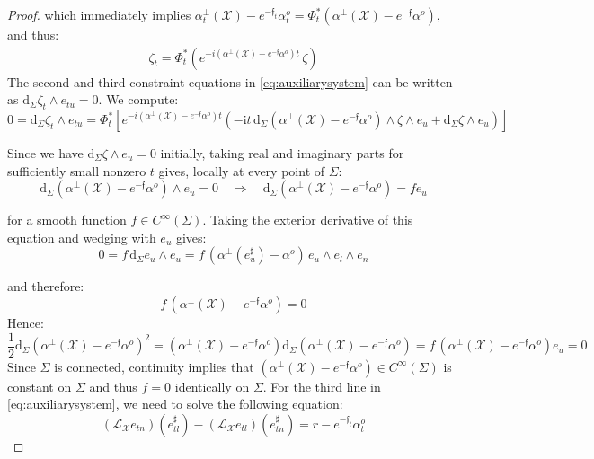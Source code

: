 \documentclass[10pt,reqno,a4paper]{amsart}
\theoremstyle{plain}
\theoremstyle{definition}
\theoremstyle{remark}
\theoremstyle{remark}
\def\dd{\mathrm{d}}
\def\cL{\mathcal{L}}
\def\cX{\mathcal{X}}
\def\cL{\mathcal{L}}
\renewcommand{\(}{ (}
\renewcommand{\)}{ )}
\newcommand{\frf}{\mathfrak{f}}
\begin{document}
\begin{proof}
\noindent
which immediately implies $\alpha^{\perp}_t (\cX) - e^{-\frf_t} \alpha^o_t = \Phi^{\ast}_t (\alpha^{\perp} (\cX) - e^{-\frf} \alpha^o)$, and thus:
\begin{eqnarray}
\label{eq:zetaux}
\zeta_t = \Phi_t^{\ast} (e^{- i (\alpha^{\perp} (\cX) - e^{-\frf} \alpha^o) t}\, \zeta)    
\end{eqnarray}
The second and third constraint equations in \eqref{eq:auxiliarysystem} can be written as $\dd_{\Sigma}\zeta_t \wedge e_{tu} = 0$. We compute:
\begin{equation*}
0 = \dd_{\Sigma}\zeta_t \wedge e_{tu} = \Phi_t^{\ast} [e^{- i (\alpha^{\perp} (\cX) - e^{-\frf} \alpha^o) t} (- \mathrm{i} t\, \dd_{\Sigma} (\alpha^{\perp} (\cX) - e^{-\frf} \alpha^o) \wedge \zeta \wedge e_u + \dd_{\Sigma}\zeta \wedge e_u) ]
\end{equation*}

\noindent
Since we have $\dd_{\Sigma}\zeta \wedge e_u = 0$ initially, taking real and imaginary parts for sufficiently small nonzero $t$ gives, locally at every point of $\Sigma$:
\begin{equation*}
\dd_{\Sigma} (\alpha^{\perp} (\cX) - e^{-\frf} \alpha^o) \wedge e_u = 0\quad \Rightarrow \quad \dd_{\Sigma} (\alpha^{\perp} (\cX) - e^{-\frf} \alpha^o)  = f e_u
\end{equation*}

\noindent
for a smooth function $f\in C^{\infty}(\Sigma)$. Taking the exterior derivative of this equation and wedging with $e_u$ gives: 
\begin{equation*}
0 = f \,\dd_{\Sigma} e_u \wedge e_u = f\, ( \alpha^{\perp} (e^{\sharp}_u) - \alpha^o)\, e_u\wedge e_l \wedge e_n
\end{equation*}

\noindent
and therefore:
\begin{equation*}
f\, (\alpha^{\perp} (\cX) - e^{-\frf} \alpha^o) = 0
\end{equation*}
Hence:
\begin{equation*}
\frac{1}{2}\dd_{\Sigma} (\alpha^{\perp} (\cX) - e^{-\frf} \alpha^o)^2 = (\alpha^{\perp} (\cX) - e^{-\frf} \alpha^o) \dd_{\Sigma} (\alpha^{\perp} (\cX) - e^{-\frf} \alpha^o) = f\, (\alpha^{\perp} (\cX) - e^{-\frf} \alpha^o) e_u = 0
\end{equation*}
Since $\Sigma$ is connected, continuity implies that $(\alpha^{\perp} (\cX) - e^{-\frf} \alpha^o) \in C^{\infty}(\Sigma)$ is constant on $\Sigma$ and thus $f=0$ identically on $\Sigma$. For the third line in \eqref{eq:auxiliarysystem}, we need to solve the following equation:
\begin{equation*}
 (\cL_{\cX}e_{tn})(e_{tl}^{\sharp}) - (\cL_{\cX}e_{tl})(e_{tn}^{\sharp}) = r - e^{-\frf_t} \alpha^o_t     
\end{equation*}


\end{proof}
\end{document}

